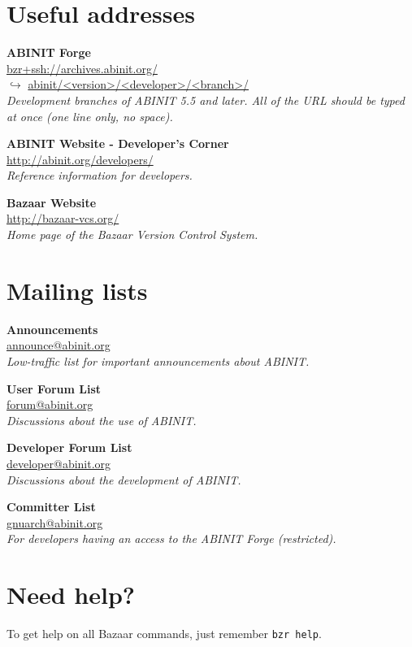 \documentclass[tumble,foldmark,a4paper]{leaflet}
\begin{document}
\newpage

\section*{Useful addresses}

\begin{center}
\textbf{ABINIT Forge} \\
\url{bzr+ssh://archives.abinit.org/} \\
$\hookrightarrow$ \url{abinit/<version>/<developer>/<branch>/} \\
\textit{Development branches of ABINIT 5.5 and later. All of the URL
should be typed at once (one line only, no space).}
\end{center}

\begin{center}
\textbf{ABINIT Website - Developer's Corner} \\
\url{http://abinit.org/developers/} \\
\textit{Reference information for developers.}
\end{center}

\begin{center}
\textbf{Bazaar Website} \\
\url{http://bazaar-vcs.org/} \\
\textit{Home page of the Bazaar Version Control System.}
\end{center}

\section*{Mailing lists}

\begin{center}
\textbf{Announcements} \\
\url{announce@abinit.org} \\
\textit{Low-traffic list for important announcements about ABINIT.}
\end{center}

\begin{center}
\textbf{User Forum List} \\
\url{forum@abinit.org} \\
\textit{Discussions about the use of ABINIT.}
\end{center}

\begin{center}
\textbf{Developer Forum List} \\
\url{developer@abinit.org} \\
\textit{Discussions about the development of ABINIT.}
\end{center}

\begin{center}
\textbf{Committer List} \\
\url{gnuarch@abinit.org} \\
\textit{For developers having an access to the ABINIT Forge (restricted).}
\end{center}

\section*{Need help?}

To get help on all Bazaar commands, just remember \texttt{bzr~help}.
\end{document}
